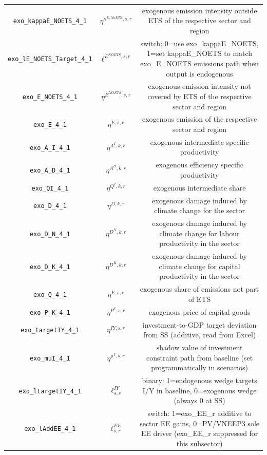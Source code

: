 \begin{center}
\begin{longtable}{ccc}
\texttt{exo\_kappaE\_NOETS\_4\_1} & ${\eta^{\kappa^{E,No ETS},s,r}}$ & exogenous emission intensity outside ETS of the respective sector and region\\
\texttt{exo\_lE\_NOETS\_Target\_4\_1} & ${\ell^{E^{NOETS},s,r}}$ & switch: 0=use exo\_kappaE\_NOETS, 1=set kappaE\_NOETS to match exo\_E\_NOETS emissions path when output is endogenous\\
\texttt{exo\_E\_NOETS\_4\_1} & ${\eta^{E^{NOETS},s,r}}$ & exogenous emission intensity not covered by ETS of the respective sector and region\\
\texttt{exo\_E\_4\_1} & ${\eta^{E,s,r}}$ & exogenous emission of the respective sector and region\\
\texttt{exo\_A\_I\_4\_1} & ${\eta^{A^{I},k,r}}$ & exogenous intermediate specific productivity\\
\texttt{exo\_A\_D\_4\_1} & ${\eta^{A^{D},k,r}}$ & exogenous efficiency specific productivity\\
\texttt{exo\_QI\_4\_1} & ${\eta^{Q^{I},k,r}}$ & exogenous intermediate share\\
\texttt{exo\_D\_4\_1} & ${\eta^{D,k,r}}$ & exogenous damage induced by climate change for the sector\\
\texttt{exo\_D\_N\_4\_1} & ${\eta^{D^{N},k,r}}$ & exogenous damage induced by climate change for labour productivity in the sector\\
\texttt{exo\_D\_K\_4\_1} & ${\eta^{D^{K},k,r}}$ & exogenous damage induced by climate change for capital productivity in the sector\\
\texttt{exo\_Q\_4\_1} & ${\eta^{E,s,r}}$ & exogenous share of emissions not part of ETS\\
\texttt{exo\_P\_K\_4\_1} & ${\eta^{P^k,s,r}}$ & exogenous price of capital goods\\
\texttt{exo\_targetIY\_4\_1} & ${\eta^{IY,s,r}}$ & investment-to-GDP target deviation from SS (additive, read from Excel)\\
\texttt{exo\_muI\_4\_1} & ${\eta^{\mu^{I},s,r}}$ & shadow value of investment constraint path from baseline (set programmatically in scenarios)\\
\texttt{exo\_ltargetIY\_4\_1} & ${\ell^{IY}_{s,r}}$ & binary: 1=endogenous wedge targets I/Y in baseline, 0=exogenous wedge (always 0 at SS)\\
\texttt{exo\_lAddEE\_4\_1} & ${\ell^{EE}_{s,r}}$ & switch: 1=exo\_EE\_r additive to sector EE gains, 0=PV/VNEEP3 sole EE driver (exo\_EE\_r suppressed for this subsector)\\

\end{longtable}
\end{center}
